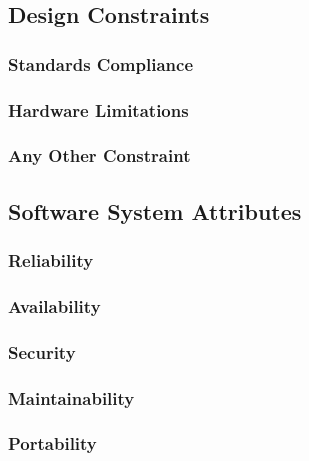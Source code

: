 \subsection{Design Constraints}
\subsubsection{Standards Compliance}
\subsubsection{Hardware Limitations}
\subsubsection{Any Other Constraint}

\subsection{Software System Attributes}
\subsubsection{Reliability}
\subsubsection{Availability}
\subsubsection{Security}
\subsubsection{Maintainability}
\subsubsection{Portability}
